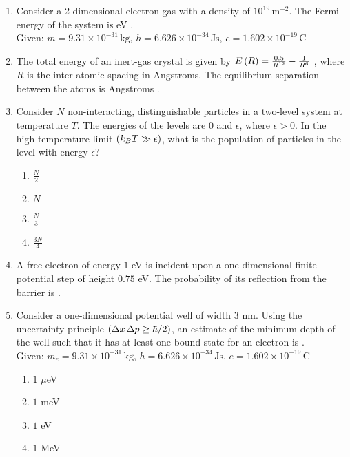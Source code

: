 \documentclass[journal,12pt,twocolumn]{IEEEtran}
\theoremstyle{remark}
\begin{document}
\begin{enumerate}[start=27]
    \item 
    Consider a 2-dimensional electron gas with a density of $10^{19} \, \text{m}^{-2}$. The Fermi energy of the system is  eV . \\
    Given: $m = 9.31 \times 10^{-31} \, \text{kg}$, $h = 6.626 \times 10^{-34} \, \text{Js}$, $e = 1.602 \times 10^{-19} \, \text{C}$
    
    \item
    The total energy of an inert-gas crystal is given by $E\left(R\right) = \frac{0.5}{R^{12}} - \frac{1}{R^6}$ , where $R$ is the inter-atomic spacing in Angstroms. The equilibrium separation between the atoms is Angstroms .
    
    \item 
    Consider $N$ non-interacting, distinguishable particles in a two-level system at temperature $T$. The energies of the levels are $0$ and $\epsilon$, where $\epsilon > 0$. In the high temperature limit $\left(k_B T \gg \epsilon\right)$, what is the population of particles in the level with energy $\epsilon$?
    \begin{enumerate}
        \item $\frac{N}{2}$
        \item $N$
        \item $\frac{N}{3}$
        \item $\frac{3N}{4}$
    \end{enumerate}
    
    \item 
    A free electron of energy $1$ eV is incident upon a one-dimensional finite potential step of height $0.75$ eV. The probability of its reflection from the barrier is .

    \item 
    Consider a one-dimensional potential well of width $3$ nm. Using the uncertainty principle $\left(\Delta x \, \Delta p \geq \hbar/2\right)$, an estimate of the minimum depth of the well such that it has at least one bound state for an electron is . \\
    Given: $m_e = 9.31 \times 10^{-31} \, \text{kg}$, $h = 6.626 \times 10^{-34} \, \text{Js}$, $e = 1.602 \times 10^{-19} \, \text{C}$
    \begin{enumerate}
        \item $1$ $\mu$eV
        \item $1$ meV
        \item $1$ eV
        \item $1$ MeV
    \end{enumerate}
    

\end{enumerate}
\end{document}
